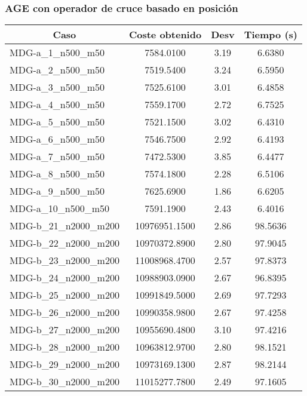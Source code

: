\documentclass[10pt,a4paper]{article}
\begin{document}
\subsubsection{AGE con operador de cruce basado en posición}
\begin{table}[H]
	\begin{center}
		\begin{tabular}{|l|c|c|c|} 
			\hline
			\multicolumn{1}{|c|}{\textbf{Caso}} & \textbf{Coste obtenido} & \textbf{Desv} & \textbf{Tiempo (s)} \\ \hline
			\hline
		MDG-a\_1\_n500\_m50 & 7584.0100 & 3.19 & 6.6380 \\ \hline
		MDG-a\_2\_n500\_m50 & 7519.5400 & 3.24 & 6.5950 \\ \hline
		MDG-a\_3\_n500\_m50 & 7525.6100 & 3.01 & 6.4858 \\ \hline
		MDG-a\_4\_n500\_m50 & 7559.1700 & 2.72 & 6.7525 \\ \hline
		MDG-a\_5\_n500\_m50 & 7521.1500 & 3.02 & 6.4310 \\ \hline
		MDG-a\_6\_n500\_m50 & 7546.7500 & 2.92 & 6.4193 \\ \hline
		MDG-a\_7\_n500\_m50 & 7472.5300 & 3.85 & 6.4477 \\ \hline
		MDG-a\_8\_n500\_m50 & 7574.1800 & 2.28 & 6.5106 \\ \hline
		MDG-a\_9\_n500\_m50 & 7625.6900 & 1.86 & 6.6205 \\ \hline
		MDG-a\_10\_n500\_m50 & 7591.1900 & 2.43 & 6.4016 \\ \hline
		MDG-b\_21\_n2000\_m200 & 10976951.1500 & 2.86 & 98.5636 \\ \hline
		MDG-b\_22\_n2000\_m200 & 10970372.8900 & 2.80 & 97.9045 \\ \hline
		MDG-b\_23\_n2000\_m200 & 11008968.4700 & 2.57 & 97.8373 \\ \hline
		MDG-b\_24\_n2000\_m200 & 10988903.0900 & 2.67 & 96.8395 \\ \hline
		MDG-b\_25\_n2000\_m200 & 10991849.5000 & 2.69 & 97.7293 \\ \hline
		MDG-b\_26\_n2000\_m200 & 10990358.9800 & 2.67 & 97.4258 \\ \hline
		MDG-b\_27\_n2000\_m200 & 10955690.4800 & 3.10 & 97.4216 \\ \hline
		MDG-b\_28\_n2000\_m200 & 10963812.9700 & 2.80 & 98.1521 \\ \hline
		MDG-b\_29\_n2000\_m200 & 10973169.1300 & 2.87 & 98.2144 \\ \hline
		MDG-b\_30\_n2000\_m200 & 11015277.7800 & 2.49 & 97.1605 \\ \hline

\end{tabular}
\end{center}
\end{table}
\end{document}
